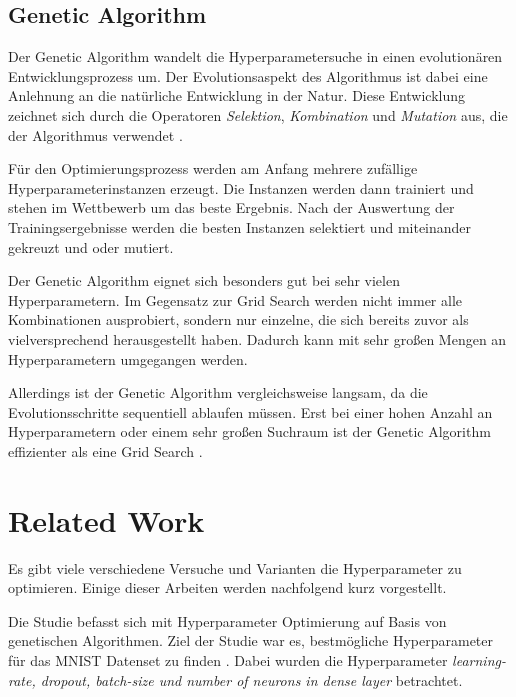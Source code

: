 \subsection{Genetic Algorithm}
Der Genetic Algorithm wandelt die Hyperparametersuche in einen evolutionären Entwicklungsprozess um.
Der Evolutionsaspekt des Algorithmus ist dabei eine Anlehnung an die natürliche Entwicklung in der Natur.
Diese Entwicklung zeichnet sich durch die Operatoren \textit{Selektion}, \textit{Kombination} und \textit{Mutation} aus, die der Algorithmus verwendet \cite{hyperparameters-genetic-algorithm}.
\newline

Für den Optimierungsprozess werden am Anfang mehrere zufällige Hyperparameterinstanzen erzeugt.
Die Instanzen werden dann trainiert und stehen im Wettbewerb um das beste Ergebnis.
Nach der Auswertung der Trainingsergebnisse werden die besten Instanzen selektiert und miteinander gekreuzt und oder mutiert.
\newline

Der Genetic Algorithm eignet sich besonders gut bei sehr vielen Hyperparametern.
Im Gegensatz zur Grid Search werden nicht immer alle Kombinationen ausprobiert, sondern nur einzelne, die sich bereits zuvor als vielversprechend herausgestellt haben.
Dadurch kann mit sehr großen Mengen an Hyperparametern umgegangen werden.

Allerdings ist der Genetic Algorithm vergleichsweise langsam, da die Evolutionsschritte sequentiell ablaufen müssen.
Erst bei einer hohen Anzahl an Hyperparametern oder einem sehr großen Suchraum ist der Genetic Algorithm effizienter als eine Grid Search \cite{hyperparameters-search-comparison-focus-genetic}.

\section{Related Work}
\label{chapter:related-work}
Es gibt viele verschiedene Versuche und Varianten die Hyperparameter zu optimieren.
Einige dieser Arbeiten werden nachfolgend kurz vorgestellt.
\newline

Die Studie befasst sich mit Hyperparameter Optimierung auf Basis von genetischen Algorithmen.
Ziel der Studie war es, bestmögliche Hyperparameter für das MNIST Datenset zu finden \cite{dataset:mnist}.
Dabei wurden die Hyperparameter \textit{learning-rate, dropout, batch-size und number of neurons in dense layer} betrachtet.
\newline

